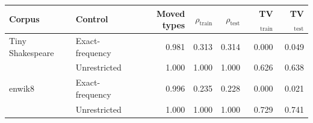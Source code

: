 \begin{tabular}{llrrrrr}
\toprule
Corpus & Control & Moved types & $\rho_{\mathrm{train}}$ & $\rho_{\mathrm{test}}$ & TV$_{\mathrm{train}}$ & TV$_{\mathrm{test}}$ \\
\midrule
Tiny Shakespeare & Exact-frequency & 0.981 & 0.313 & 0.314 & 0.000 & 0.049 \\
 & Unrestricted & 1.000 & 1.000 & 1.000 & 0.626 & 0.638 \\
enwik8 & Exact-frequency & 0.996 & 0.235 & 0.228 & 0.000 & 0.021 \\
 & Unrestricted & 1.000 & 1.000 & 1.000 & 0.729 & 0.741 \\
\bottomrule
\end{tabular}
